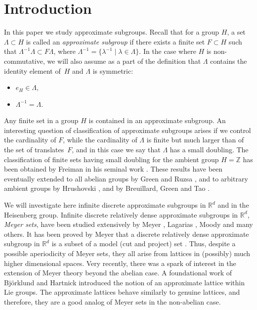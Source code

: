 \documentclass[JEP,XML,SOM,Unicode,NoEqCountersInSection]{cedram}
\newcommand{\bR}{\mathbb{R}}
\newcommand{\bZ}{\mathbb{Z}}
\theoremstyle{plain}
\theoremstyle{definition}
\begin{document}
\section{Introduction}

In this paper we study approximate subgroups. Recall that for a group $H$, a set $\Lambda \subset H$ is called an \textit{approximate subgroup} if there exists a finite set $F \subset H$ such that $\Lambda^{-1}\Lambda \subset F \Lambda $, where $\Lambda^{-1} = \{ \lambda^{-1} \mid \lambda \in \Lambda \}$. In the case where $H$ is non-commutative, we will also assume as a part of the definition that $\Lambda$ contains the identity element of~$H$ and $\Lambda$ is symmetric:\enlargethispage{.2\baselineskip}%
\begin{itemize}
\item $e_H \in \Lambda$,
\item $\Lambda^{-1} = \Lambda$.
\end{itemize}

Any finite set in a group $H$ is contained in an approximate subgroup. An interesting question of classification of approximate subgroups arises if we control the cardinality of $F$, while the cardinality of $\Lambda$ is finite but much larger than of the set of translates~$F$, and in this case we say that $\Lambda$ has a small doubling. The classification of finite sets having small doubling for the ambient group $H = \bZ$ has been obtained by Freiman in his seminal work \cite{Fr}. These results have been eventually extended to all abelian groups by Green and Ruzsa \cite{GR}, and to arbitrary ambient groups by Hrushovski \cite{Hr}, and by Breuillard, Green and Tao \cite{BGT}.

We will investigate here infinite discrete approximate subgroups in $\bR^d$ and in the Heisenberg group.
Infinite discrete relatively dense approximate subgroups in $\bR^d$, \textit{Meyer sets}, have been studied extensively by Meyer \cite{Me}, Lagarias \cite{La}, Moody \cite{Mo} and many others.
It has been proved by Meyer \cite{Me} that a discrete relatively dense approximate subgroup in $\bR^d$ is a subset of a model (cut and project) set \cite{Mo}.
Thus, despite a possible aperiodicity of Meyer sets, they all arise from lattices in (possibly) much higher dimensional spaces. Very recently, there was a spark of interest in the extension of Meyer theory beyond the abelian case. A foundational work of Björklund and Hartnick \cite{BH} introduced the notion of an approximate lattice within Lie groups. The approximate lattices behave similarly to genuine lattices, and therefore, they are a good analog of Meyer sets in the non-abelian case.
\end{document}
